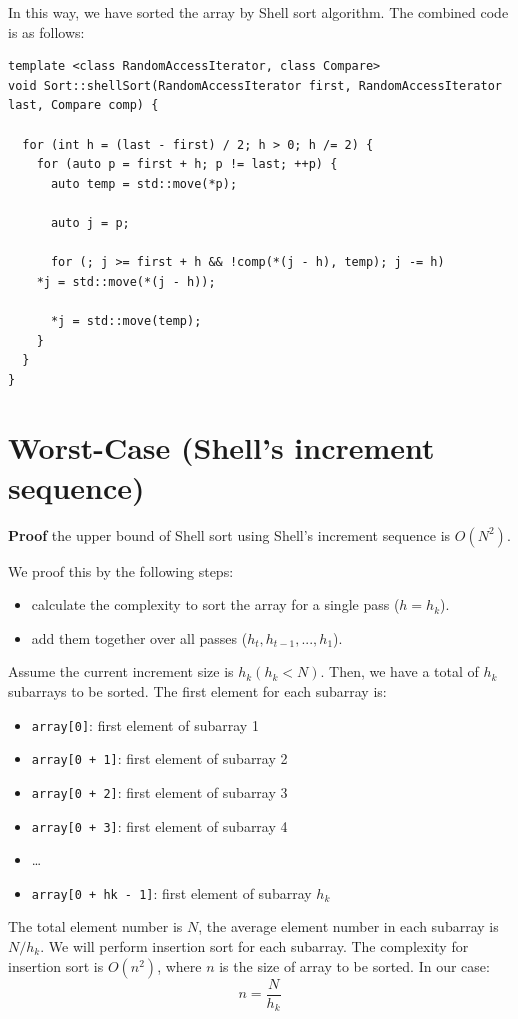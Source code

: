 \documentclass[11pt]{book}
\begin{document}
In this way, we have sorted the array by Shell sort algorithm. The combined code is as follows:
\begin{verbatim}
template <class RandomAccessIterator, class Compare>
void Sort::shellSort(RandomAccessIterator first, RandomAccessIterator last, Compare comp) {

  for (int h = (last - first) / 2; h > 0; h /= 2) {
    for (auto p = first + h; p != last; ++p) {
      auto temp = std::move(*p);

      auto j = p;

      for (; j >= first + h && !comp(*(j - h), temp); j -= h)
	*j = std::move(*(j - h));

      *j = std::move(temp);
    }
  }
}
\end{verbatim}
\section{Worst-Case (Shell's increment sequence)}
\label{sec:org5ba733a}
\textbf{Proof} the upper bound of Shell sort using Shell's increment sequence is \(O(N^2)\).

We proof this by the following steps:
\begin{itemize}
\item calculate the complexity to sort the array for a single pass (\(h = h_k\)).
\item add them together over all passes (\(h_t, h_{t - 1}, ..., h_1\)).
\end{itemize}

Assume the current increment size is \(h_k (h_k < N)\). Then, we have a total of \(h_k\) subarrays to be sorted. The first element for each subarray is:
\begin{itemize}
\item \texttt{array[0]}: first element of subarray 1
\item \texttt{array[0 + 1]}: first element of subarray 2
\item \texttt{array[0 + 2]}: first element of subarray 3
\item \texttt{array[0 + 3]}: first element of subarray 4
\item \ldots{}
\item \texttt{array[0 + hk - 1]}: first element of subarray \(h_k\)
\end{itemize}

The total element number is \(N\), the average element number in each subarray is \(N/h_k\). We will perform insertion sort for each subarray. The complexity for insertion sort is \(O(n^2)\), where \(n\) is the size of array to be sorted. In our case:
\[
n = \frac {N} {h_k}
\]
\end{document}
